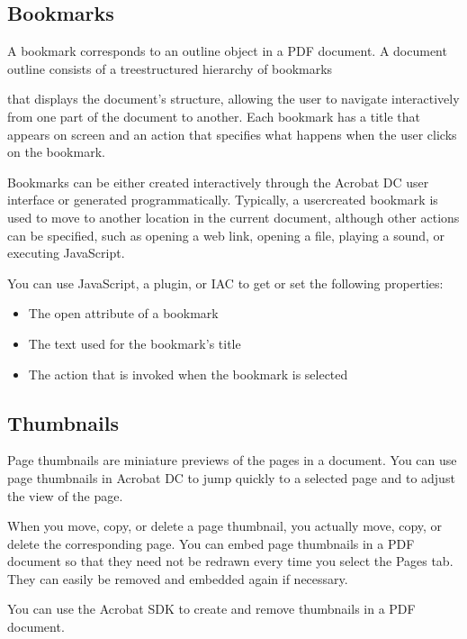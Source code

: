 \documentclass[letterpaper,12pt,english,openany,oneside]{sphinxmanual}
\begin{document}
\subsection{Bookmarks}
\label{\detokenize{Overview_Editing:bookmarks}}
A bookmark corresponds to an outline object in a PDF document. A document outline consists of a tree\sphinxhyphen{}structured hierarchy of bookmarks

that displays the document’s structure, allowing the user to navigate interactively from one part of the document to another. Each bookmark has a title that appears on screen and an action that specifies what happens when the user clicks on the bookmark.

Bookmarks can be either created interactively through the Acrobat DC user interface or generated programmatically. Typically, a user\sphinxhyphen{}created bookmark is used to move to another location in the current document, although other actions can be specified, such as opening a web link, opening a file, playing a sound, or executing JavaScript.

You can use JavaScript, a plug\sphinxhyphen{}in, or IAC to get or set the following properties:
\begin{itemize}
\item {} 
The open attribute of a bookmark

\item {} 
The text used for the bookmark’s title

\item {} 
The action that is invoked when the bookmark is selected

\end{itemize}




\subsection{Thumbnails}
\label{\detokenize{Overview_Editing:thumbnails}}
Page thumbnails are miniature previews of the pages in a document. You can use page thumbnails in Acrobat DC to jump quickly to a selected page and to adjust the view of the page.

When you move, copy, or delete a page thumbnail, you actually move, copy, or delete the corresponding page. You can embed page thumbnails in a PDF document so that they need not be redrawn every time you select the Pages tab. They can easily be removed and embedded again if necessary.

You can use the Acrobat SDK to create and remove thumbnails in a PDF document.
\end{document}
